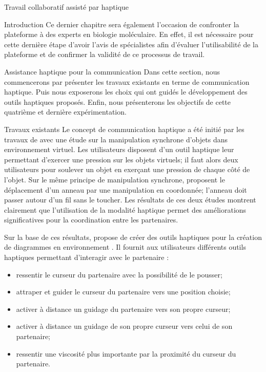 \documentclass[myfrancais,ngerman,english,french]{mythesis}
\begin{document}
\begin{mychapter}{Travail collaboratif assisté par haptique}
\begin{mysection}{Introduction}
			Ce dernier chapitre sera également l'occasion de confronter la plateforme \myShaddock à des experts en biologie moléculaire.
			En effet, il est nécessaire pour cette dernière étape d'avoir l'avis de spécialistes afin d'évaluer l'utilisabilité de la plateforme et de confirmer la validité de ce processus de travail.
		\end{mysection}
		\begin{mysection}{Assistance haptique pour la communication}
			Dans cette section, nous commencerons par présenter les travaux existants en terme de communication haptique.
			Puis nous exposerons les choix qui ont guidés le développement des outils haptiques proposés.
			Enfin, nous présenterons les objectifs de cette quatrième et dernière expérimentation.
			\begin{mysubsection}{Travaux existants}
				Le concept de communication haptique a été initié par les travaux de  avec une étude sur la manipulation synchrone d'objets \myThreeD dans environnement virtuel.
				Les utilisateurs disposent d'un outil haptique leur permettant d'exercer une pression sur les objets \myThreeD virtuels; il faut alors deux utilisateurs pour soulever un objet en exerçant une pression de chaque côté de l'objet.
				Sur le même principe de manipulation synchrone,  proposent le déplacement d'un anneau par une manipulation en  coordonnée; l'anneau doit passer autour d'un fil sans le toucher.
				Les résultats de ces deux études montrent clairement que l'utilisation de la modalité haptique permet des améliorations significatives pour la coordination entre les partenaires.

				Sur la base de ces résultats,  propose de créer des outils haptiques pour la création de diagrammes  en environnement \myTwoD.
				Il fournit aux utilisateurs différents outils haptiques permettant d'interagir avec le partenaire :
				\begin{itemize}
					\item ressentir le curseur du partenaire avec la possibilité de le pousser;
					\item attraper et guider le curseur du partenaire vers une position choisie;
					\item activer à distance un guidage du partenaire vers son propre curseur;
					\item activer à distance un guidage de son propre curseur vers celui de son partenaire;
					\item ressentir une viscosité plus importante par la proximité du curseur du partenaire.
				\end{itemize}


\end{mysubsection}
\end{mysection}
\end{mychapter}
\end{document}
